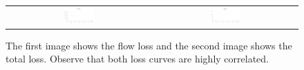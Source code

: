 \documentclass[11pt,a4paper]{article}
\begin{document}
\begin{figure}[h!]
    \centering
    \begin{tabular}{cc} %
        \includegraphics[width=0.22\textwidth]{Reports/4-Final-Report/images/intrinsic_metric/flow_loss.png} & 
        \includegraphics[width=0.22\textwidth]{Reports/4-Final-Report/images/intrinsic_metric/total_loss.png} \\ 
     
    \end{tabular}
    \caption{The first image shows the flow loss and the second image shows the total loss. Observe that both loss curves are highly correlated.}
    \label{fig:Flow_losses}
\end{figure}
\end{document}
